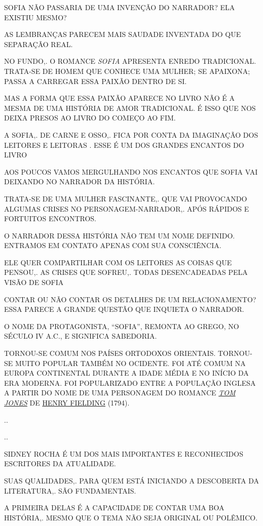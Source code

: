 \documentclass{extarticle}
\begin{document}
SOFIA NÃO PASSARIA DE UMA INVENÇÃO DO NARRADOR? ELA EXISTIU MESMO?
 
AS LEMBRANÇAS PARECEM MAIS SAUDADE INVENTADA DO QUE SEPARAÇÃO REAL.
 
NO FUNDO,. O ROMANCE \emph{SOFIA} APRESENTA ENREDO TRADICIONAL. TRATA-SE
DE HOMEM QUE CONHECE UMA MULHER; SE APAIXONA; PASSA A CARREGAR ESSA
PAIXÃO DENTRO DE SI.
 
MAS A FORMA QUE ESSA PAIXÃO APARECE NO LIVRO NÃO É A MESMA DE UMA
HISTÓRIA DE AMOR TRADICIONAL. É ISSO QUE NOS DEIXA PRESOS AO LIVRO DO
COMEÇO AO FIM.

A SOFIA,. DE CARNE E OSSO,. FICA POR CONTA DA IMAGINAÇÃO DOS LEITORES E
LEITORAS . ESSE É UM DOS GRANDES ENCANTOS DO LIVRO
 
AOS POUCOS VAMOS MERGULHANDO NOS ENCANTOS QUE SOFIA VAI DEIXANDO NO
NARRADOR DA HISTÓRIA.
 
TRATA-SE DE UMA MULHER FASCINANTE,. QUE VAI PROVOCANDO ALGUMAS CRISES NO
PERSONAGEM-NARRADOR,. APÓS RÁPIDOS E FORTUITOS ENCONTROS.
 
O NARRADOR DESSA HISTÓRIA NÃO TEM UM NOME DEFINIDO. ENTRAMOS EM CONTATO
APENAS COM SUA CONSCIÊNCIA.
 
ELE QUER COMPARTILHAR COM OS LEITORES AS COISAS QUE PENSOU,. AS CRISES
QUE SOFREU,. TODAS DESENCADEADAS PELA VISÃO DE SOFIA
 
CONTAR OU NÃO CONTAR OS DETALHES DE UM RELACIONAMENTO? ESSA PARECE A
GRANDE QUESTÃO QUE INQUIETA O NARRADOR.

O NOME DA PROTAGONISTA, ``SOFIA'', REMONTA AO GREGO, NO SÉCULO IV A.C.,
E SIGNIFICA SABEDORIA.
 
TORNOU-SE COMUM NOS PAÍSES ORTODOXOS ORIENTAIS. TORNOU-SE MUITO POPULAR
TAMBÉM NO OCIDENTE. FOI ATÉ COMUM NA EUROPA CONTINENTAL DURANTE A IDADE
MÉDIA E NO INÍCIO DA ERA MODERNA. FOI POPULARIZADO ENTRE A POPULAÇÃO
INGLESA A PARTIR DO NOME DE UMA PERSONAGEM DO ROMANCE
\href{https://pt.wikipedia.org/wiki/The_History_of_Tom_Jones,_a_Foundling}{\emph{TOM
JONES}} DE \href{https://pt.wikipedia.org/wiki/Henry_Fielding}{HENRY
FIELDING} (1794).

..

..

SIDNEY ROCHA É UM DOS MAIS IMPORTANTES E RECONHECIDOS ESCRITORES DA
ATUALIDADE.
 
SUAS QUALIDADES,. PARA QUEM ESTÁ INICIANDO A DESCOBERTA DA LITERATURA,.
SÃO FUNDAMENTAIS.
 
A PRIMEIRA DELAS É A CAPACIDADE DE CONTAR UMA BOA HISTÓRIA,. MESMO QUE O
TEMA NÃO SEJA ORIGINAL OU POLÊMICO.
 
\end{document}
